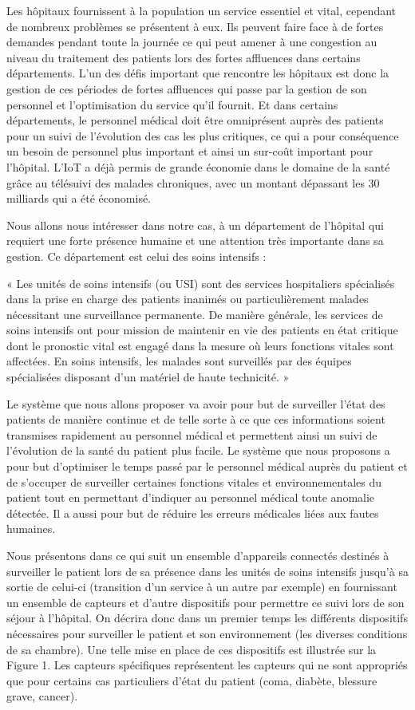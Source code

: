 \documentclass{article}
\begin{document}
 Les hôpitaux fournissent à la population un service essentiel et vital, cependant de nombreux problèmes se présentent à eux. Ils peuvent faire face à de fortes demandes pendant toute la journée ce qui peut amener à une congestion au niveau du traitement des patients lors des fortes affluences dans certains départements. L’un des défis important que rencontre les hôpitaux est donc la gestion de ces périodes de fortes affluences qui passe par la gestion de son personnel et l’optimisation du service qu’il fournit. Et dans certains départements, le personnel médical doit être omniprésent auprès des patients pour un suivi de l’évolution des cas les plus critiques, ce qui a pour conséquence un besoin de personnel plus important et ainsi un sur-coût important pour l’hôpital. L'IoT a déjà permis de grande économie dans le domaine de la santé grâce au télésuivi des malades chroniques, avec un montant dépassant les 30 milliards qui a été économisé.\cite{OrangeHealthCare}
 
 Nous allons nous intéresser dans notre cas, à un département de l’hôpital qui requiert une forte présence humaine et une attention très importante dans sa gestion. Ce département est celui des soins intensifs :
 
 « Les unités de soins intensifs (ou USI) sont des services hospitaliers spécialisés dans la prise en charge des patients inanimés ou particulièrement malades nécessitant une surveillance permanente. De manière générale, les services de soins intensifs ont pour mission de maintenir en vie des patients en état critique dont le pronostic vital est engagé dans la mesure où leurs fonctions vitales sont affectées. En soins intensifs, les malades sont surveillés par des équipes spécialisées disposant d'un matériel de haute technicité. » \cite{SoinsIntensifs}

Le système que nous allons proposer va avoir pour but de surveiller l’état des patients de manière continue et de telle sorte à ce que ces informations soient transmises rapidement au personnel médical et permettent ainsi un suivi de l’évolution de la santé du patient plus facile. Le système que nous proposons a pour but d’optimiser le temps passé par le personnel médical auprès du patient et de s’occuper de surveiller certaines fonctions vitales et environnementales du patient tout en permettant d’indiquer au personnel médical toute anomalie détectée. Il a aussi pour but de réduire les erreurs médicales liées aux fautes humaines. 

Nous présentons dans ce qui suit un ensemble d’appareils connectés destinés à surveiller le patient lors de sa présence dans les unités de soins intensifs jusqu'à sa sortie de celui-ci (transition d’un service à un autre par exemple) en fournissant un ensemble de capteurs et d’autre dispositifs pour permettre ce suivi lors de son séjour à l’hôpital. On décrira donc dans un premier temps les différents dispositifs nécessaires pour surveiller le patient et son environnement (les diverses conditions de sa chambre). Une telle mise en place de ces dispositifs est illustrée sur la Figure 1. Les capteurs spécifiques représentent les capteurs qui ne sont appropriés que pour certains cas particuliers d’état du patient (coma, diabète, blessure grave, cancer).
\end{document}
